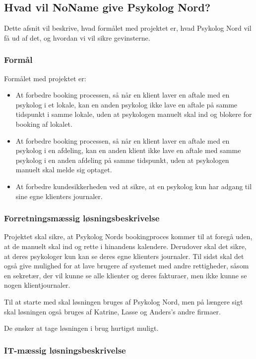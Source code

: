 \subsection{Hvad vil NoName give Psykolog Nord?}
Dette afsnit vil beskrive, hvad formålet med projektet er, hvad Psykolog Nord vil få ud af det, og hvordan vi vil sikre gevinsterne.

\subsubsection{Formål}
Formålet med projektet er:

\begin{itemize}
    \item At forbedre booking processen, så når en klient laver en aftale med en psykolog i et lokale, kan en anden psykolog ikke lave en aftale på samme tidspunkt i samme lokale, uden at psykologen manuelt skal ind og blokere for booking af lokalet.
    \item At forbedre booking processen, så når en klient laver en aftale med en psykolog i en afdeling, kan en anden klient ikke lave en aftale med samme psykolog i en anden afdeling på samme tidspunkt, uden at psykologen manuelt skal melde sig optaget.
    \item At forbedre kundesikkerheden ved at sikre, at en psykolog kun har adgang til sine egne klienters journaler.
\end{itemize}

\subsubsection{Forretningsmæssig løsningsbeskrivelse}

Projektet skal sikre, at Psykolog Nords bookingproces kommer til at foregå uden, at de manuelt skal ind og rette i hinandens kalendere.
Derudover skal det sikre, at deres psykologer kun kan se deres egne klienters journaler. 
Til sidst skal det også give mulighed for at lave brugere af systemet med andre rettigheder, såsom en sekretær, der vil kunne se alle klienter og deres fakturaer, men ikke kunne se nogen klientjournaler.

Til at starte med skal løsningen bruges af Psykolog Nord, men på længere sigt skal løsningen også bruges af Katrine, Lasse og Anders's andre firmaer.

De ønsker at tage løsningen i brug hurtigst muligt.

\subsubsection{IT-mæssig løsningsbeskrivelse}

